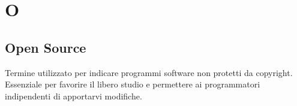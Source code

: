 \section*{O}

\subsection{Open Source}
Termine utilizzato per indicare programmi software non protetti da copyright. Essenziale per favorire il libero studio e permettere ai programmatori indipendenti di apportarvi modifiche.
